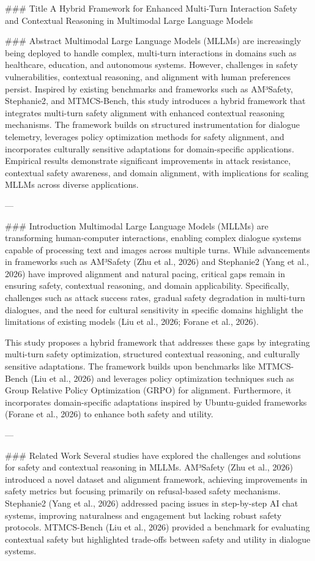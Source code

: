 ### Title  
A Hybrid Framework for Enhanced Multi-Turn Interaction Safety and Contextual Reasoning in Multimodal Large Language Models  

### Abstract  
Multimodal Large Language Models (MLLMs) are increasingly being deployed to handle complex, multi-turn interactions in domains such as healthcare, education, and autonomous systems. However, challenges in safety vulnerabilities, contextual reasoning, and alignment with human preferences persist. Inspired by existing benchmarks and frameworks such as AM³Safety, Stephanie2, and MTMCS-Bench, this study introduces a hybrid framework that integrates multi-turn safety alignment with enhanced contextual reasoning mechanisms. The framework builds on structured instrumentation for dialogue telemetry, leverages policy optimization methods for safety alignment, and incorporates culturally sensitive adaptations for domain-specific applications. Empirical results demonstrate significant improvements in attack resistance, contextual safety awareness, and domain alignment, with implications for scaling MLLMs across diverse applications.  

---

### Introduction  
Multimodal Large Language Models (MLLMs) are transforming human-computer interactions, enabling complex dialogue systems capable of processing text and images across multiple turns. While advancements in frameworks such as AM³Safety (Zhu et al., 2026) and Stephanie2 (Yang et al., 2026) have improved alignment and natural pacing, critical gaps remain in ensuring safety, contextual reasoning, and domain applicability. Specifically, challenges such as attack success rates, gradual safety degradation in multi-turn dialogues, and the need for cultural sensitivity in specific domains highlight the limitations of existing models (Liu et al., 2026; Forane et al., 2026).  

This study proposes a hybrid framework that addresses these gaps by integrating multi-turn safety optimization, structured contextual reasoning, and culturally sensitive adaptations. The framework builds upon benchmarks like MTMCS-Bench (Liu et al., 2026) and leverages policy optimization techniques such as Group Relative Policy Optimization (GRPO) for alignment. Furthermore, it incorporates domain-specific adaptations inspired by Ubuntu-guided frameworks (Forane et al., 2026) to enhance both safety and utility.  

---

### Related Work  
Several studies have explored the challenges and solutions for safety and contextual reasoning in MLLMs. AM³Safety (Zhu et al., 2026) introduced a novel dataset and alignment framework, achieving improvements in safety metrics but focusing primarily on refusal-based safety mechanisms. Stephanie2 (Yang et al., 2026) addressed pacing issues in step-by-step AI chat systems, improving naturalness and engagement but lacking robust safety protocols. MTMCS-Bench (Liu et al., 2026) provided a benchmark for evaluating contextual safety but highlighted trade-offs between safety and utility in dialogue systems.  

